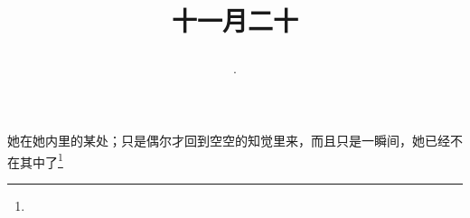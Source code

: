 \title{\date[d=20,m=12,y=2024][year:cn-y,年,month:cn,day:cn,日,·,weekday]·十一月二十 }
她在她内里的某处；只是偶尔才回到空空的知觉里来，而且只是一瞬间，她已经不在其中了\footnote{ }

